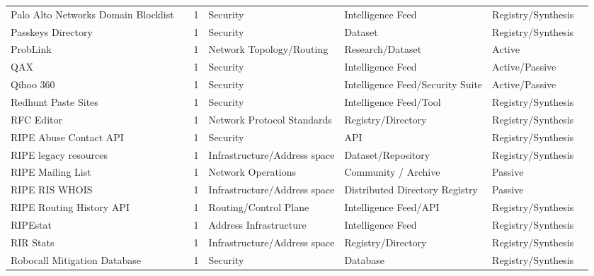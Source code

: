 \documentclass[11pt,a4paper]{article}
\begin{document}
\begin{longtable}{@{}p{}p{}p{}p{}p{}p{}p{}@{}}
Palo Alto Networks Domain Blocklist & \cite{paloalto} & 1 & Security & Intelligence Feed & Registry/Synthesis & \cite{10.1145/3618257.3624805} \\
Passkeys Directory & \cite{passkey} & 1 & Security & Dataset & Registry/Synthesis & \cite{10.1007/978-3-032-18268-5_15} \\
ProbLink & \cite{problink} & 1 & Network Topology/Routing & Research/Dataset & Active & \cite{10.1145/3487552.3487825} \\
QAX & \cite{qax} & 1 & Security & Intelligence Feed & Active/Passive & \cite{10.1145/3618257.3624839} \\
Qihoo 360 & \cite{qihoo} & 1 & Security & Intelligence Feed/Security Suite & Active/Passive & \cite{10.1007/978-3-031-56249-5_6} \\
Redhunt Paste Sites & \cite{redhunt} & 1 & Security & Intelligence Feed/Tool & Registry/Synthesis & \cite{10.1145/3777912.3809151} \\
RFC Editor & \cite{rfc} & 1 & Network Protocol Standards & Registry/Directory & Registry/Synthesis & \cite{10.1145/3487552.3487821} \\
RIPE Abuse Contact API & \cite{ripeabuse} & 1 & Security & API & Registry/Synthesis & \cite{10.1145/3777912.3809155} \\
RIPE legacy resources & \cite{ripelegacy} & 1 & Infrastructure/Address space & Dataset/Repository & Registry/Synthesis & \cite{10.1145/3487552.3487838} \\
RIPE Mailing List & \cite{ripemailinglists} & 1 & Network Operations & Community / Archive & Passive & \cite{10.1007/978-3-032-18268-5_5} \\
RIPE RIS WHOIS & \cite{riswhois} & 1 & Infrastructure/Address space & Distributed Directory Registry & Passive & \cite{10.1145/3777912.3839812} \\
RIPE Routing History API & \cite{historyapi} & 1 & Routing/Control Plane & Intelligence Feed/API & Registry/Synthesis & \cite{10.1145/3517745.3561421} \\
RIPEstat & \cite{ripestat} & 1 & Address Infrastructure & Intelligence Feed & Registry/Synthesis & \cite{10.1007/978-3-032-18268-5_9} \\
RIR Stats & \cite{rir_stats} & 1 & Infrastructure/Address space & Registry/Directory & Registry/Synthesis & \cite{10.1145/3517745.3561454} \\
Robocall Mitigation Database & \cite{robocalldatabase} & 1 & Security & Database & Registry/Synthesis & \cite{10.1145/3777912.3839819} \\

\end{longtable}
\end{document}
